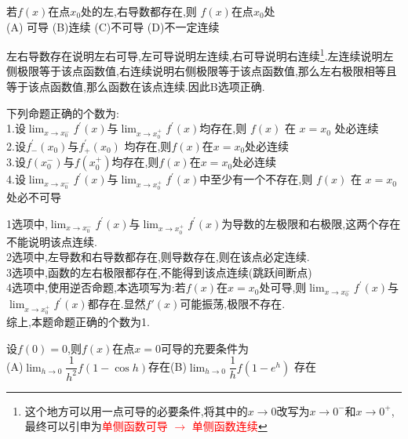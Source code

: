 \documentclass[8pt a4paper, oneside, UTF8]{ctexbook}  %
\begin{document}
\begin{sloppypar}
\begin{solution}
    \end{solution}
    \begin{problem}
    若$f(x)$在点$x_{0}$处的左,右导数都存在,则 $f(x)$在点$x_{0}$处\\
    (A) 可导 \quad (B)连续 \quad  (C)不可导 \quad (D)不一定连续
    \end{problem}
    \begin{solution}
        左右导数存在说明左右可导,左可导说明左连续,右可导说明右连续\footnote{这个地方可以用一点可导的必要条件,将其中的$x \to 0$改写为$x \to 0^-$和$x \to 0^+$,最终可以引申为\textcolor{red}{单侧函数可导 $\to$ 单侧函数连续}}.左连续说明左侧极限等于该点函数值,右连续说明右侧极限等于该点函数值,那么左右极限相等且等于该点函数值,那么函数在该点连续.因此B选项正确.
    \end{solution}
    \begin{problem}
    下列命题正确的个数为:\\
    1.设$\lim_{x\to x_0^-}f^{\prime}(x)$与$\lim_{x\to x_0^+}f^{\prime}(x)$均存在,则 $f(x)$ 在 $x=x_0$ 处必连续\\
    2.设$f^{\prime}_-(x_{0})$与$f^{\prime}_{+}(x_{0})$ 均存在,则$f(x)$在$x=x_{0}$处必连续\\
    3.设$f(x_{0}^{-})$与$f(x_{0}^{+})$均存在,则$f(x)$在$x=x_{0}$处必连续\\
    4.设$\lim_{x\to x_{0}^{-}}f^{\prime}(x)$与$\lim_{x\to x_{0}^{+}}f^{\prime}(x)$中至少有一个不存在,则 $f(x)$ 在 $x=x_0$ 处必不可导
    \end{problem}
    \begin{solution}
        1选项中,$\lim_{x\to x_0^-}f^{\prime}(x)$与$\lim_{x\to x_0^+}f^{\prime}(x)$为导数的左极限和右极限,这两个存在不能说明该点连续.\\
        2选项中,左导数和右导数都存在,则导数存在,则在该点必定连续.\\
        3选项中,函数的左右极限都存在,不能得到该点连续(跳跃间断点)\\
        4选项中,使用逆否命题,本选项写为:若$f(x)$在$x=x_0$处可导,则$\lim_{x\to x_{0}^{-}}f^{\prime}(x)$与$\lim_{x\to x_{0}^{+}}f^{\prime}(x)$都存在.显然$f'(x)$可能振荡,极限不存在.\\
        综上,本题命题正确的个数为1.
    \end{solution}
    \begin{problem}
    设$f(0)=0$,则$f(x)$在点$x=0$可导的充要条件为\\
    (A)$\lim_{h\to0}\dfrac{1}{h^{2}}f(1-\cos h)$存在\quad(B)$\lim_{h\to0}\dfrac{1}{h}f(1-e^h)$ 存在\\

\end{problem}
\end{sloppypar}
\end{document}
